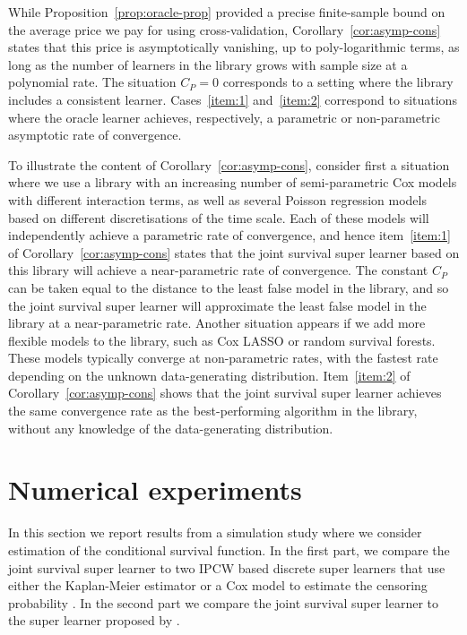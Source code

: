 \documentclass[a4paper,danish]{article}
\theoremstyle{plain} %
\numberwithin{theorem}{section}
\theoremstyle{definition} %
\theoremstyle{remark}
\newcommand{\1}{\mathds{1}}
\begin{document}
While Proposition~\ref{prop:oracle-prop} provided a precise
finite-sample bound on the average price we pay for using
cross-validation, Corollary~\ref{cor:asymp-cons} states that this
price is asymptotically vanishing, up to poly-logarithmic terms, as
long as the number of learners in the library grows with sample size
at a polynomial rate. The situation \( C_P=0 \) corresponds to a
setting where the library includes a consistent learner.
Cases~\ref{item:1} and~\ref{item:2} correspond to situations where the
oracle learner achieves, respectively, a parametric or non-parametric
asymptotic rate of convergence.

To illustrate the content of Corollary~\ref{cor:asymp-cons}, consider
first a situation where we use a library with an increasing number of
semi-parametric Cox models with different interaction terms, as well
as several Poisson regression models based on different
discretisations of the time scale. Each of these models will
independently achieve a parametric rate of convergence, and hence
item~\ref{item:1} of Corollary~\ref{cor:asymp-cons} states that the
joint survival super learner based on this library will achieve a
near-parametric rate of convergence. The constant \( C_P \) can be
taken equal to the distance to the least false model in the library,
and so the joint survival super learner will approximate the least
false model in the library at a near-parametric rate. Another
situation appears if we add more flexible models to the library, such
as Cox LASSO or random survival forests. These models typically
converge at non-parametric rates, with the fastest rate depending on
the unknown data-generating distribution. Item~\ref{item:2} of
Corollary~\ref{cor:asymp-cons} shows that the joint survival super
learner achieves the same convergence rate as the best-performing
algorithm in the library, without any knowledge of the data-generating
distribution.


\section{Numerical experiments}
\label{sec:numer-exper}


In this section we report results from a simulation study where we consider
estimation of the conditional survival function. In the first part, we compare
the joint survival super learner to two IPCW based discrete super learners that use either the
Kaplan-Meier estimator or a Cox model to estimate the censoring probability
\citep{gonzalez2021stacked}. In the second part we compare the joint survival super learner to
the super learner proposed by \cite{westling2021inference}.
\end{document}
